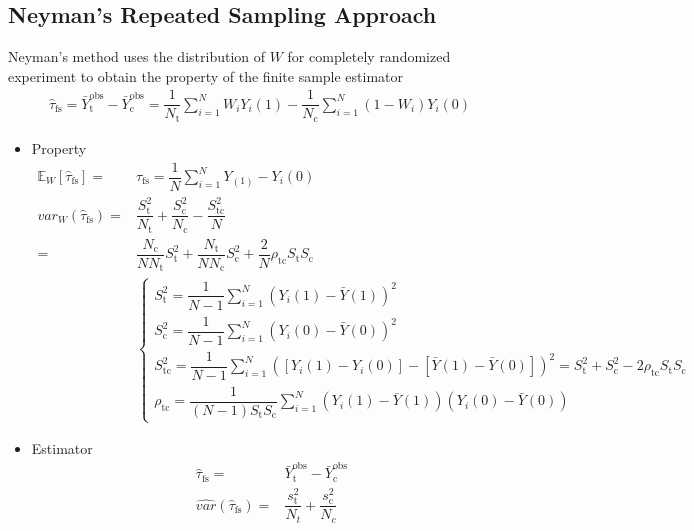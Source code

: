     
\subsection{Neyman's Repeated Sampling Approach}
Neyman's method uses the distribution of $ W $ for completely randomized experiment to obtain the property of the finite sample estimator
\begin{align}
    \hat{\tau}_\mathrm{fs}=\bar{Y}_\mathrm{t}^\mathrm{obs}-\bar{Y}_\mathrm{c}^\mathrm{obs}= \dfrac{1}{N_\mathrm{t} }\sum_{i=1}^N W_iY_i(1)-\dfrac{1}{N_\mathrm{c} } \sum_{i=1}^N(1-W_i)Y_i(0)   
\end{align}

\begin{itemize}[topsep=2pt,itemsep=0pt]
    \item Property
    \begin{align}
        \mathbb{E}_W\left[ \hat{\tau}_\mathrm{fs}  \right] = & \tau_\mathrm{fs}=\dfrac{1}{N}\sum_{i=1}^NY_(1)-Y_i(0) \\
        var_W(\hat{\tau}_\mathrm{fs} )=&\dfrac{S_\mathrm{t} ^2}{N_\mathrm{t} }+\dfrac{S_\mathrm{c} ^2}{N_\mathrm{c} }-\dfrac{S^2_{\mathrm{tc} }}{N}\\
        =&\dfrac{N_\mathrm{c} }{NN_\mathrm{t} }S_\mathrm{t} ^2+\dfrac{N_\mathrm{t} }{NN_\mathrm{c} }S_\mathrm{c}^2+\dfrac{2}{N}\rho _{\mathrm{tc} }S_\mathrm{t}S_\mathrm{c}    \\
        &\begin{cases}
            S_\mathrm{t}^2=\dfrac{1}{N-1}\sum_{i=1}^N(Y_i(1)-\bar{Y}(1))^2\\
            S_\mathrm{c}^2=\dfrac{1}{N-1}\sum_{i=1}^N(Y_i(0)-\bar{Y}(0))^2\\
            S_\mathrm{tc}^2=\dfrac{1}{N-1}\sum_{i=1}^N\left([Y_i(1)-Y_i(0)]-[\bar{Y}(1)-\bar{Y}(0)]\right)^2=S_\mathrm{t}^2+S_\mathrm{c}^2-2\rho _\mathrm{tc}S_\mathrm{t}S_{\mathrm{c} }    \\
            \rho _\mathrm{tc}=\dfrac{1}{(N-1)S_\mathrm{t}S_{\mathrm{c} } }\sum_{i=1}^N\left(Y_i(1)-\bar{Y}(1)\right)\left(Y_i(0)-\bar{Y}(0)\right) 
        \end{cases}
    \end{align}
    \item Estimator
    \begin{align}
        \hat{\tau}_\mathrm{fs}= & \bar{Y}_\mathrm{t}^\mathrm{obs}-\bar{Y}_\mathrm{c}^\mathrm{obs}\\
        \hat{var}(\hat{\tau}_\mathrm{fs} )=&\dfrac{s^2_\mathrm{t} }{N_t}+\dfrac{s^2_\mathrm{c} }{N_c}\\

\end{align}
\end{itemize}
